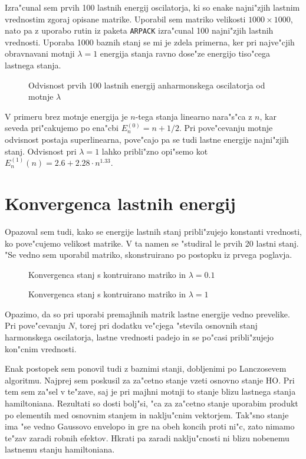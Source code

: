 \documentclass[a4paper,10pt]{article}
\begin{document}
Izra"cunal sem prvih 100 lastnih energij oscilatorja, ki so enake najni"zjih lastnim vrednostim zgoraj opisane matrike. Uporabil sem matriko velikosti $1000\times1000$, nato pa z uporabo rutin iz paketa \texttt{ARPACK} izra"cunal 100 najni"zjih lastnih vrednosti. Uporaba 1000 baznih stanj se mi je zdela primerna, ker pri najve"cjih obravnavani motnji $\lambda=1$ energija stanja ravno dose"ze energijo tiso"cega lastnega stanja. 

\begin{figure}[H]
 \centering

\caption{Odvisnost prvih 100 lastnih energij anharmonskega oscilatorja od motnje $\lambda$}
\label{fig:lastne-energije}
\end{figure}

V primeru brez motnje energija je $n$-tega stanja linearno nara"s"ca z $n$, kar seveda pri"cakujemo po ena"cbi $E_n^{(0)} = n + 1/2$. Pri pove"cevanju motnje odvisnost postaja superlinearna, pove"cajo pa se tudi lastne energije najni"zjih stanj. Odvisnost pri $\lambda=1$ lahko pribli"zno opi"semo kot $E_n^{(1)}(n) = 2.6 + 2.28 \cdot n^{1.33}$. 

\section{Konvergenca lastnih energij}

Opazoval sem tudi, kako se energije lastnih stanj pribli"zujejo konstanti vrednosti, ko pove"cujemo velikost matrike. V ta namen se "studiral le prvih 20 lastni stanj. "Se vedno sem uporabil matriko, skonstruirano po postopku iz prvega poglavja. 

\begin{figure}[H]
\centering

\caption{Konvergenca stanj s kontruirano matriko in $\lambda=0.1$}
\end{figure}

\begin{figure}[H]
\centering

\caption{Konvergenca stanj s kontruirano matriko in $\lambda=1$}
\end{figure}

Opazimo, da so pri uporabi premajhnih matrik lastne energije vedno prevelike. Pri pove"cevanju $N$, torej pri dodatku ve"cjega "stevila osnovnih stanj harmonskega oscilatorja, lastne vrednosti padejo in se po"casi pribli"zujejo kon"cnim vrednosti. 

Enak postopek sem ponovil tudi z baznimi stanji, dobljenimi po Lanczosevem algoritmu. Najprej sem poskusil za za"cetno stanje vzeti osnovno stanje HO. Pri tem sem za"sel v te"zave, saj je pri majhni motnji to stanje blizu lastnega stanja hamiltoniana. Rezultati so dosti bolj"si, "ca za za"cetno stanje uporabim produkt po elementih med osnovnim stanjem in naklju"cnim vektorjem. Tak"sno stanje ima "se vedno Gaussovo envelopo in gre na obeh koncih proti ni"c, zato nimamo te"zav zaradi robnih efektov. Hkrati pa zaradi naklju"cnosti ni blizu nobenemu lastnemu stanju hamiltoniana. 
\end{document}
